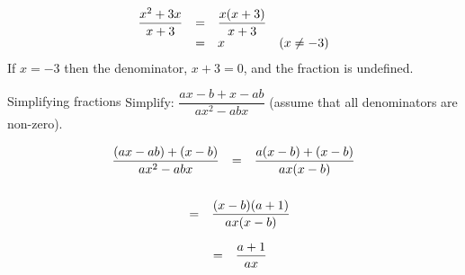 \begin{equation*}
\begin{array}{llll} \dfrac{{x}^{2}+3x}{x+3}\hfill & =& \dfrac{x(x+3)}{x+3}\hfill & \\ & =& x\hfill & (x\neq -3)\hfill \end{array}
\end{equation*}
If $x = -3$ then the denominator, $x+3 = 0$, and the fraction is undefined. 

\begin{wex}{Simplifying fractions }{Simplify: $\dfrac{ax-b+x-ab}{a{x}^{2}-abx}$ (assume that all denominators are non-zero).}{




\begin{equation*}
\begin{array}{lll}\dfrac{(ax-ab)+(x-b)}{a{x}^{2}-abx}\hfill & =& \dfrac{a(x-b)+(x-b)}{ax(x-b)}\hfill \\ \end{array}
\end{equation*}
\begin{equation*}
\begin{array}{lll}
\\& =& \dfrac{(x-b)(a+1)}{ax(x-b)}\hfill \end{array}
\end{equation*}

\begin{equation*}
\begin{array}{ccc}& =& \dfrac{a+1}{ax}\hfill \end{array}
\end{equation*}
}
\end{wex}


